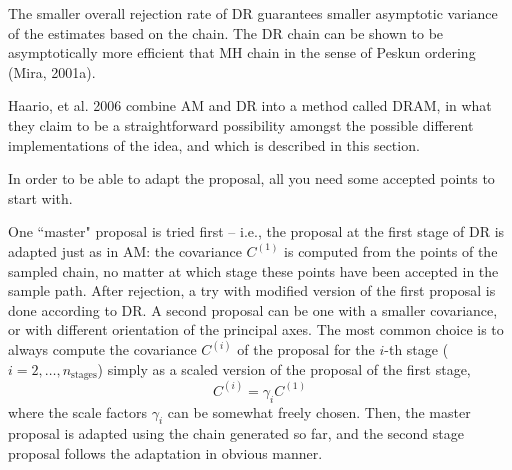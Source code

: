The smaller overall rejection rate of DR guarantees smaller asymptotic variance
of the estimates based on the chain. The DR chain can be shown to be
asymptotically more efficient that MH chain in the sense of Peskun ordering
(Mira, 2001a). 

% 
% 
% 


Haario, et al. 2006 \cite{HaLaMiSa06} combine AM and DR into a method called
DRAM, in what they claim to be a straightforward possibility amongst the
possible different implementations of the idea, and which is described in this
section.

In order to be able to adapt the proposal, all you need some accepted points to
start with. 
%

One ``master" proposal is tried first -- i.e., the proposal at the first stage
of DR is adapted just as in AM: the covariance $C^{(1)}$  is computed from the
points of the sampled chain, no matter at which stage these points have been
accepted in the sample path.  After rejection, a try with modified version of
the first proposal is done according to DR. A second proposal can be one with a
smaller covariance, or with different orientation of the principal axes. The
most common choice is to always compute the covariance $C^{(i)}$  of the
proposal for the $i$-th stage ($i=2,\ldots, n_\text{stages}$) simply as a
scaled version of the proposal of the first stage, $$C^{(i)} = \gamma_i
C^{(1)}$$ where the scale factors $\gamma_i$ can be somewhat freely chosen.
Then, the master proposal is adapted using the chain generated so far, and the
second stage proposal follows the adaptation in obvious manner.

